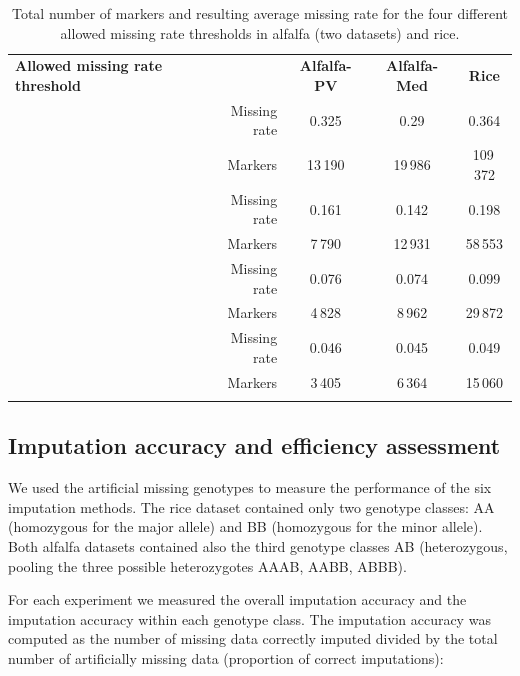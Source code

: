 \makeatletter{}
\begin{table}
\centering
\caption[Markers counts and missing rates]{
Total number of markers and resulting average missing rate for the four different allowed missing rate thresholds in alfalfa (two datasets) and rice.}
\label{tab:missing_rates}
\begin{tabular}{C{3cm}rccc}
\hline\noalign{\smallskip}
\noalign{\smallskip}\hline\noalign{\smallskip}
\textbf{Allowed missing rate threshold} &  & \textbf{Alfalfa-PV} & \textbf{Alfalfa-Med} & \textbf{Rice}\\
\noalign{\smallskip}\Xhline{3\arrayrulewidth}\noalign{\smallskip}
    & Missing rate &  0.325 & 0.29  & 0.364\\
                           & Markers      & 13\,190  & 19\,986 & 109\,372\\    
\noalign{\smallskip}\hline
    & Missing rate &  0.161 & 0.142 & 0.198\\
                           & Markers      & 7\,790 & 12\,931 & 58\,553\\    
\noalign{\smallskip}\hline
    & Missing rate & 0.076 & 0.074 & 0.099\\
                           & Markers      & 4\,828 & 8\,962 & 29\,872\\
\noalign{\smallskip}\hline                           
    & Missing rate & 0.046 & 0.045 & 0.049\\
                           & Markers      & 3\,405 & 6\,364 & 15\,060 \\
\noalign{\smallskip}\hline
\end{tabular}
\end{table}


\subsection{Imputation accuracy and efficiency assessment}
\label{sec:imputation_accuracy_and_efficiency_assessment}
We used the artificial missing genotypes to measure the performance of the six imputation methods. The rice dataset contained only two genotype classes: AA (homozygous for the major allele) and BB (homozygous for the minor allele). Both alfalfa datasets contained also the third genotype classes AB (heterozygous, pooling the three possible heterozygotes AAAB, AABB, ABBB).

For each experiment we measured the overall imputation accuracy and the imputation accuracy within each genotype class. The imputation accuracy was computed as the number of missing data correctly imputed divided by the total number of artificially missing data (proportion of correct imputations):


